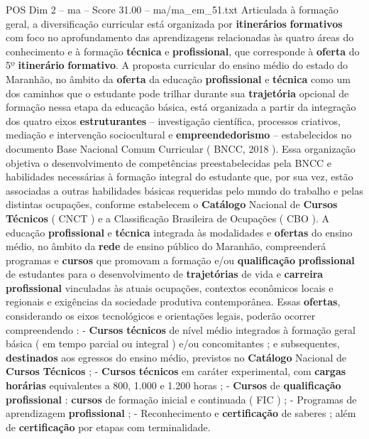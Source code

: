 \begin{textsample}{POS Dim 2 – ma – Score 31.00 – ma/ma\_em\_51.txt}
Articulada à formação geral, a diversificação curricular está organizada por \textbf{itinerários} \textbf{formativos} com foco no aprofundamento das aprendizagens relacionadas às quatro áreas do conhecimento e à formação \textbf{técnica} e \textbf{profissional}, que corresponde à \textbf{oferta} do 5º \textbf{itinerário} \textbf{formativo}.
A proposta curricular do ensino médio do estado do Maranhão, no âmbito da \textbf{oferta} da educação \textbf{profissional} e \textbf{técnica} como um dos caminhos que o estudante pode trilhar durante sua \textbf{trajetória} opcional de formação nessa etapa da educação básica, está organizada a partir da integração dos quatro eixos \textbf{estruturantes} – investigação científica, processos criativos, mediação e intervenção sociocultural e \textbf{empreendedorismo} – estabelecidos no documento Base Nacional Comum Curricular ( BNCC, 2018 ).
Essa organização objetiva o desenvolvimento de competências preestabelecidas pela BNCC e habilidades necessárias à formação integral do estudante que, por sua vez, estão associadas a outras habilidades básicas requeridas pelo mundo do trabalho e pelas distintas ocupações, conforme estabelecem o \textbf{Catálogo} Nacional de \textbf{Cursos} \textbf{Técnicos} ( CNCT ) e a Classificação Brasileira de Ocupações ( CBO ).
A educação \textbf{profissional} e \textbf{técnica} integrada às modalidades e \textbf{ofertas} do ensino médio, no âmbito da \textbf{rede} de ensino público do Maranhão, compreenderá programas e \textbf{cursos} que promovam a formação e/ou \textbf{qualificação} \textbf{profissional} de estudantes para o desenvolvimento de \textbf{trajetórias} de vida e \textbf{carreira} \textbf{profissional} vinculadas às atuais ocupações, contextos econômicos locais e regionais e exigências da sociedade produtiva contemporânea.
Essas \textbf{ofertas}, considerando os eixos tecnológicos e orientações legais, poderão ocorrer compreendendo : - \textbf{Cursos} \textbf{técnicos} de nível médio integrados à formação geral básica ( em tempo parcial ou integral ) e/ou concomitantes ; e subsequentes, \textbf{destinados} aos egressos do ensino médio, previstos no \textbf{Catálogo} Nacional de \textbf{Cursos} \textbf{Técnicos} ; - \textbf{Cursos} \textbf{técnicos} em caráter experimental, com \textbf{cargas} \textbf{horárias} equivalentes a 800, 1.000 e 1.200 horas ; - \textbf{Cursos} de \textbf{qualificação} \textbf{profissional} : \textbf{cursos} de formação inicial e continuada ( FIC ) ; - Programas de aprendizagem \textbf{profissional} ; - Reconhecimento e \textbf{certificação} de saberes ; além de \textbf{certificação} por etapas com terminalidade.

\end{textsample}
